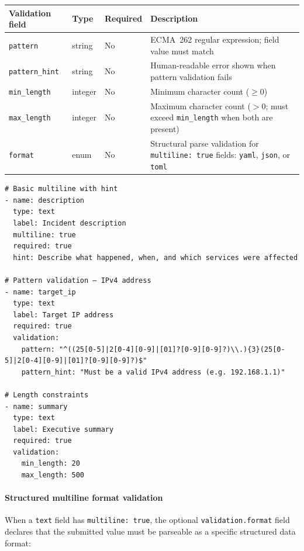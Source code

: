 \begin{center}
\begin{tabular}{lllp{5cm}}
\hline
\textbf{Validation field} & \textbf{Type} & \textbf{Required} & \textbf{Description} \\
\hline
\texttt{pattern}       & string  & No & ECMA~262 regular expression; field value must match \\
\texttt{pattern\_hint} & string  & No & Human-readable error shown when pattern validation fails \\
\texttt{min\_length}   & integer & No & Minimum character count ($\geq 0$) \\
\texttt{max\_length}   & integer & No & Maximum character count ($> 0$; must exceed \texttt{min\_length} when both are present) \\
\texttt{format}        & enum    & No & Structural parse validation for \texttt{multiline: true} fields: \texttt{yaml}, \texttt{json}, or \texttt{toml} \\
\hline
\end{tabular}
\end{center}

\begin{verbatim}
# Basic multiline with hint
- name: description
  type: text
  label: Incident description
  multiline: true
  required: true
  hint: Describe what happened, when, and which services were affected

# Pattern validation — IPv4 address
- name: target_ip
  type: text
  label: Target IP address
  required: true
  validation:
    pattern: "^((25[0-5]|2[0-4][0-9]|[01]?[0-9][0-9]?)\\.){3}(25[0-5]|2[0-4][0-9]|[01]?[0-9][0-9]?)$"
    pattern_hint: "Must be a valid IPv4 address (e.g. 192.168.1.1)"

# Length constraints
- name: summary
  type: text
  label: Executive summary
  required: true
  validation:
    min_length: 20
    max_length: 500
\end{verbatim}

\paragraph{Structured multiline format validation}
\label{par:text-format}
\label{sec:collector_field_validation}

When a \texttt{text} field has \texttt{multiline: true}, the optional
\texttt{validation.format} field declares that the submitted value must be
parseable as a specific structured data format:


